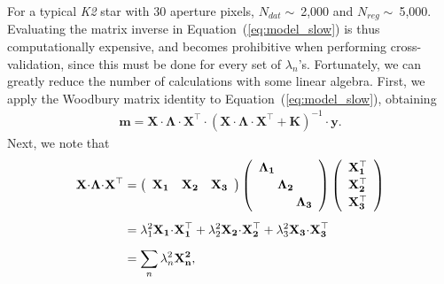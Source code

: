 \documentclass[]{emulateapj}
\begin{document}
For a typical \emph{K2} star with 30 aperture pixels, $N_{dat} \sim\ $2,000 and
$N_{reg} \sim\ $5,000. Evaluating the matrix inverse in Equation~(\ref{eq:model_slow})
is thus computationally expensive, and becomes prohibitive when performing cross-validation,
since this must be done for every set of $\lambda_{n}$'s. Fortunately, we can greatly reduce 
the number of calculations with some linear algebra. First, we apply the Woodbury matrix 
identity to Equation~(\ref{eq:model_slow}), obtaining
%
\begin{align}
\label{eq:model_woodbury}
\mathbf{m} =      \mathbf{X} \cdot \mathbf{\Lambda} \cdot \mathbf{X}^\top
                  \cdot
                  \left(
                  \mathbf{X} \cdot \mathbf{\Lambda} \cdot \mathbf{X}^\top + \mathbf{K}
                  \right)^{-1} 
                  \cdot
                  \mathbf{y}.
\end{align}
%
Next, we note that
%
\begin{align}
\label{eq:separable1}
\mathbf{X} \hspace{-2pt} \cdot \hspace{-2pt} \mathbf{\Lambda} \hspace{-2pt} \cdot \hspace{-2pt} \mathbf{X}^\top &= 
%
\left(
\begin{array}{ccc}
  \mathbf{X_1} & \mathbf{X_2} & \mathbf{X_3}
\end{array}
\right)
%
\left(
\begin{array}{ccc}
  \mathbf{\Lambda_1}\hspace*{-8pt}      &                                     & \\[2pt]
  &                                     \mathbf{\Lambda_2}\hspace*{-8pt}      & \\[2pt]
  &                                     &                                     \mathbf{\Lambda_3} \\
\end{array}
\right)
%
\left(
\begin{array}{c}
  \mathbf{X_1^\top} \\[2pt]
  \mathbf{X_2^\top} \\[2pt]
  \mathbf{X_3^\top} \\
\end{array}
\right) \nonumber\\[5pt]
%
&= \lambda_1^2 \mathbf{X_1} \hspace{-2pt} \cdot \hspace{-2pt} \mathbf{X^\top_1} +
   \lambda_2^2 \mathbf{X_2} \hspace{-2pt} \cdot \hspace{-2pt} \mathbf{X^\top_2} +
   \lambda_3^2 \mathbf{X_3} \hspace{-2pt} \cdot \hspace{-2pt} \mathbf{X^\top_3} \nonumber\\[5pt]
%
&= \sum_n \lambda_n^2 \mathbf{X^2_n},
\end{align}
\end{document}
